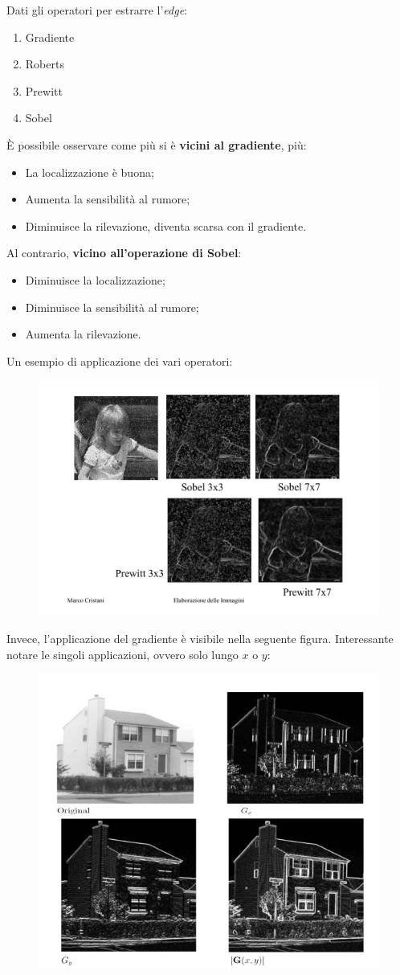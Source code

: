 \documentclass[a4paper]{article}
\begin{document}
	Dati gli operatori per estrarre l'\emph{edge}:
	\begin{enumerate}
		\item Gradiente
		\item Roberts
		\item Prewitt
		\item Sobel
	\end{enumerate}
	È possibile osservare come più si è \textbf{vicini al gradiente}, più:
	\begin{itemize}
		\item La localizzazione è buona;
		\item Aumenta la sensibilità al rumore;
		\item Diminuisce la rilevazione, diventa scarsa con il gradiente.
	\end{itemize}
	Al contrario, \textbf{vicino all'operazione di Sobel}:
	\begin{itemize}
		\item Diminuisce la localizzazione;
		\item Diminuisce la sensibilità al rumore;
		\item Aumenta la rilevazione.
	\end{itemize}
	Un esempio di applicazione dei vari operatori:
	\begin{figure}[!htp]
		\centering
		\includegraphics[width=.65\textwidth]{img/confronto_tra_operatori.pdf}
	\end{figure}\newpage
	
	\noindent
	Invece, l'applicazione del gradiente è visibile nella seguente figura. Interessante notare le singoli applicazioni, ovvero solo lungo $x$ o $y$:
	\begin{figure}[!htp]
		\centering
		\includegraphics[width=.8\textwidth]{img/gradiente_examples.png}
	\end{figure}\newpage
\end{document}
